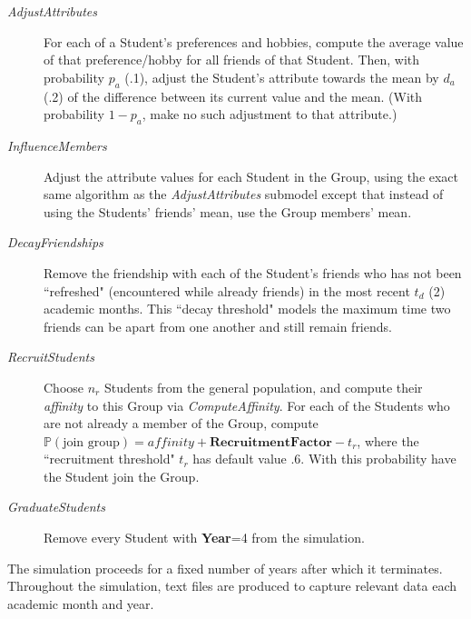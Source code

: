 \begin{description}
\item[\textsl{AdjustAttributes}] For each of a Student's preferences and
hobbies, compute the average value of that preference/hobby for all friends of
that Student. Then, with probability $p_a$ (.1), adjust the Student's
attribute towards the mean by $d_a$ (.2) of the difference between its current
value and the mean. (With probability $1-p_a$, make no such adjustment to that
attribute.)

\item[\textsl{InfluenceMembers}] Adjust the attribute values for each Student
in the Group, using the exact same algorithm as the \textsl{AdjustAttributes}
submodel except that instead of using the Students' friends' mean, use the
Group members' mean.

\item[\textsl{DecayFriendships}] Remove the friendship with each of the
Student's friends who has not been ``refreshed" (encountered while already
friends) in the most recent $t_d$ (2) academic months. This ``decay threshold"
models the maximum time two friends can be apart from one another and still
remain friends.

\item[\textsl{RecruitStudents}] Choose $n_r$ Students from the general
population, and compute their \textit{affinity} to this Group via
\textsl{ComputeAffinity}. For each of the Students who are not already a
member of the Group, compute $\mathbb{P}(\text{join group})= \textit{affinity}
+ \textbf{RecruitmentFactor} - t_r$, where the ``recruitment threshold" $t_r$
has default value .6. With this probability have the Student join the Group.

\item[\textsl{GraduateStudents}] Remove every Student with \textbf{Year}=4 from the
simulation.

\end{description}

The simulation proceeds for a fixed number of years after which it terminates.
Throughout the simulation, text files are produced to capture relevant data
each academic month and year.

